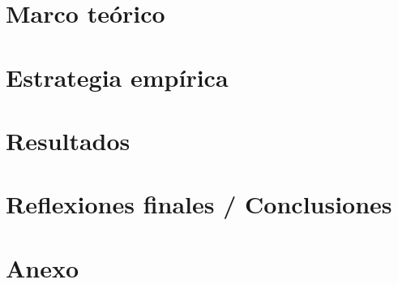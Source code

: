 \documentclass[11pt]{article}
\begin{document}
\section{Marco teórico}


\section{Estrategia empírica}


\section{Resultados}


\section{Reflexiones finales / Conclusiones}



\cleardoublepage
{}
{}






% 

\newpage


\appendix
\section{Anexo}



\end{document}
